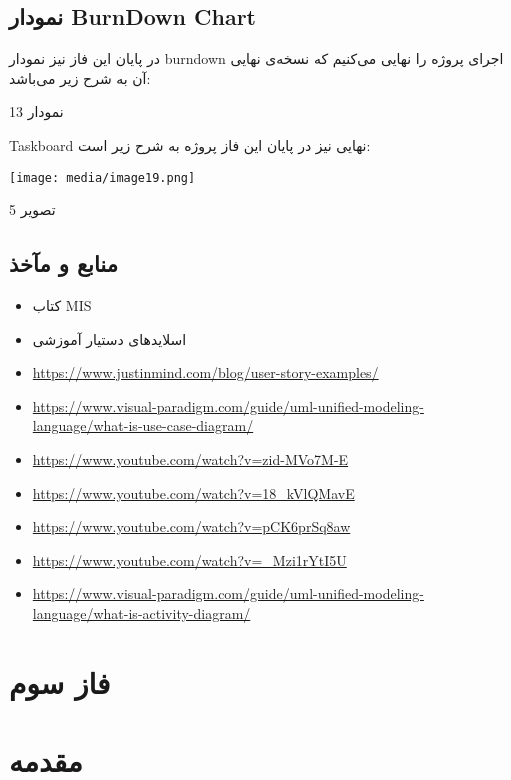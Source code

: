 \documentclass[]{article}
\begin{document}
\subsection{نمودار BurnDown
Chart}\label{ux646ux645ux648ux62fux627ux631-burndown-chart-1}

در پایان این فاز نیز نمودار burndown اجرای پروژه را نهایی می‌کنیم که
نسخه‌ی نهایی آن به شرح زیر می‌باشد:

نمودار 13

Taskboard نهایی نیز در پایان این فاز پروژه به شرح زیر است:

\texttt{[image: media/image19.png]}

تصویر 5

\subsection{منابع و
مآخذ}\label{ux645ux646ux627ux628ux639-ux648-ux645ux622ux62eux630-1}

\begin{itemize}
\item
  کتاب MIS
\item
  اسلایدهای دستیار آموزشی
\end{itemize}

\begin{itemize}
\item
  \url{https://www.justinmind.com/blog/user-story-examples/}
\item
  \url{https://www.visual-paradigm.com/guide/uml-unified-modeling-language/what-is-use-case-diagram/}
\item
  \url{https://www.youtube.com/watch?v=zid-MVo7M-E}
\item
  \url{https://www.youtube.com/watch?v=18_kVlQMavE}
\item
  \url{https://www.youtube.com/watch?v=pCK6prSq8aw}
\item
  \url{https://www.youtube.com/watch?v=_Mzi1rYtI5U}
\item
  \url{https://www.visual-paradigm.com/guide/uml-unified-modeling-language/what-is-activity-diagram/}
\end{itemize}

\section{فاز سوم}\label{ux641ux627ux632-ux633ux648ux645}

\section{مقدمه}\label{ux645ux642ux62fux645ux647-2}
\end{document}
